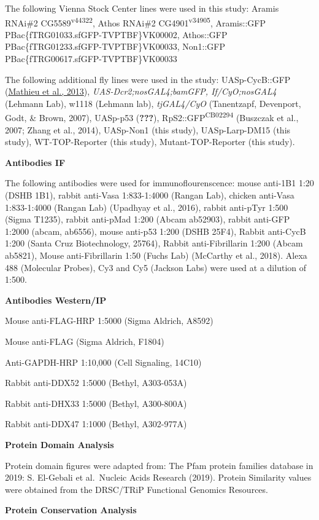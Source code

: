 \documentclass[12pt,oneside]{reedthesis}
\begin{document}
The following Vienna Stock Center lines were used in this study: Aramis
RNAi\#2 CG5589\textsuperscript{v44322}, Athos RNAi\#2 CG4901\textsuperscript{v34905}, Aramis::GFP
PBac\{fTRG01033.sfGFP-TVPTBF\}VK00002, Athos::GFP
PBac\{fTRG01233.sfGFP-TVPTBF\}VK00033, Non1::GFP
PBac\{fTRG00617.sfGFP-TVPTBF\}VK00033

The following additional fly lines were used in the study:
UASp-CycB::GFP (\href{https://www.ncbi.nlm.nih.gov/pmc/articles/PMC5830152/\#R25}{Mathieu et al.,
2013}),
\emph{UAS-Dcr2;nosGAL4;bamGFP, If/CyO;nosGAL4} (Lehmann Lab), w1118 (Lehmann
lab),
\emph{tjGAL4/CyO} (Tanentzapf, Devenport, Godt, \& Brown, 2007),
UASp-p53 ({\textbf{???}}), RpS2::GFP\textsuperscript{CB02294}
(Buszczak et al., 2007; Zhang et al., 2014), UASp-Non1 (this
study), UASp-Larp-DM15 (this study), WT-TOP-Reporter (this study),
Mutant-TOP-Reporter (this study).

\textbf{Antibodies IF}

The following antibodies were used for immunoflourenscence: mouse
anti-1B1 1:20 (DSHB 1B1), rabbit anti-Vasa 1:833-1:4000 (Rangan Lab),
chicken anti-Vasa 1:833-1:4000 (Rangan Lab)
(Upadhyay et al., 2016), rabbit anti-pTyr
1:500 (Sigma T1235), rabbit anti-pMad 1:200 (Abcam ab52903), rabbit
anti-GFP 1:2000 (abcam, ab6556), mouse anti-p53 1:200 (DSHB 25F4),
Rabbit anti-CycB 1:200 (Santa Cruz Biotechnology, 25764), Rabbit
anti-Fibrillarin 1:200 (Abcam ab5821), Mouse anti-Fibrillarin 1:50
(Fuchs Lab) (McCarthy et al., 2018). Alexa 488 (Molecular Probes), Cy3 and
Cy5 (Jackson Labs) were used at a dilution of 1:500.

\textbf{Antibodies Western/IP}

Mouse anti-FLAG-HRP 1:5000 (Sigma Aldrich, A8592)

Mouse anti-FLAG (Sigma Aldrich, F1804)

Anti-GAPDH-HRP 1:10,000 (Cell Signaling, 14C10)

Rabbit anti-DDX52 1:5000 (Bethyl, A303-053A)

Rabbit anti-DHX33 1:5000 (Bethyl, A300-800A)

Rabbit anti-DDX47 1:1000 (Bethyl, A302-977A)

\textbf{Protein Domain Analysis}

Protein domain figures were adapted from: The Pfam protein families
database in 2019: S. El-Gebali et al.~Nucleic Acids Research (2019).
Protein Similarity values were obtained from the DRSC/TRiP Functional
Genomics Resources.

\textbf{Protein Conservation Analysis}
\end{document}
